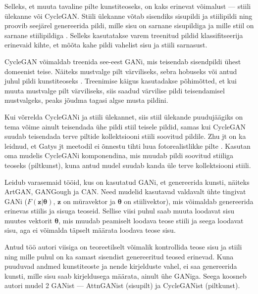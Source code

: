 \documentclass{vilgym}
\begin{document}
	Selleks, et muuta tavaline pilte kunstiteoseks, on kaks erinevat võimalust --- stiili ülekanne või CycleGAN. Stiili ülekanne võtab sisendiks sisupildi ja stiilipildi ning proovib seejärel genereerida pildi, mille sisu on sarnane sisupildiga ja mille stiil on sarnane stiilipildiga \parencite{styletransfer}.
	Selleks kasutatakse varem treenitud pildid klassifitseerija erinevaid kihte, et mõõta kahe pildi vahelist sisu ja stiili sarnasust. 

	CycleGAN võimaldab treenida see-eest GANi, mis teisendab sisendpildi ühest domeenist teise. Näiteks mustvalge pilt värviliseks, sebra hobuseks või antud juhul pildi kunstiteoseks \parencite{cyclegan}. Treenimise käigus kasutadakse põhimõtted, et kui muuta mustvalge pilt värviliseks, siis saadud värvilise pildi teisendamisel mustvalgeks, peaks jõudma tagasi algse musta pildini.

	Kui võrrelda CycleGANi ja stiili ülekannet, siis stiil ülekande puudujäägiks on tema võime ainult teisendada ühe pildi stiil teisele pildid, samas kui CycleGAN suudab teisendada terve piltide kollektsiooni stiili soovitud pildile. Zhu jt on ka leidnud, et Gatys jt meetodil ei õnnestu tihti luua fotorealistlikke pilte \parencite{cyclegan}. Kasutan oma mudelis CycleGANi komponendina, mis muudab pildi soovitud stiiliga teoseks (pilt\textrightarrow kunst), kuna antud mudel suudab kanda üle terve kollektsiooni stiili.

	Leidub varasemaid tööid, kus on kasutatud GANi, et genereerida kunsti, näiteks ArtGAN\parencite{artgan}, GANGough ja CAN\parencite{can}. Need mudelid kasutavad valdavalt ühte tingivat GANi ($ F(\boldsymbol{z}|\boldsymbol{\theta}) $, $ \boldsymbol{z} $ on müravektor ja $ \boldsymbol{\theta} $ on stiilivektor), mis võimaldab genereerida erinevas stiilis ja sisuga teoseid. Sellise viisi puhul saab muuta loodavat sisu muutes vektorit $ \boldsymbol{\theta} $, mis muudab peamiselt loodava teose stiili ja seega loodavat sisu, aga ei võimalda täpselt määrata loodava teose sisu. 

	Antud töö autori viisiga on teoreetilselt võimalik kontrollida teose sisu ja stiili ning mille puhul on ka samast sisendist genereeritud teosed erinevad. Kuna puuduvad andmed kunstiteoste ja nende kirjelduste vahel, ei saa genereerida kunsti, mille sisu saab kirjeldusega määrata, ainult ühe GANiga. Seega koosneb autori mudel 2 GANist --- AttnGANist (sisu\textrightarrow pilt) ja CycleGANist (pilt\textrightarrow kunst). %


\end{document}
